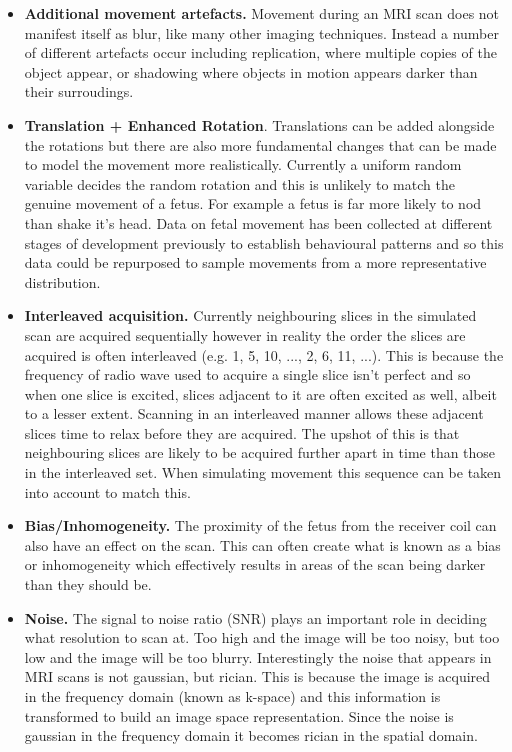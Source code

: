 \begin{itemize}
  \item \textbf{Additional movement artefacts.} Movement during an MRI scan does not manifest itself as blur, like many other imaging techniques. Instead a number of different artefacts occur including replication, where multiple copies of the object appear, or shadowing where objects in motion appears darker than their surroudings.

  \item \textbf{Translation + Enhanced Rotation}. Translations can be added alongside the rotations but there are also more fundamental changes that can be made to model the movement more realistically. Currently a uniform random variable decides the random rotation and this is unlikely to match the genuine movement of a fetus. For example a fetus is far more likely to nod than shake it's head. Data on fetal movement has been collected at different stages of development previously to establish behavioural patterns\cite{fetalmovement} and so this data could be repurposed to sample movements from a more representative distribution.

  \item \textbf{Interleaved acquisition.} Currently neighbouring slices in the simulated scan are acquired sequentially however in reality the order the slices are acquired is often interleaved (e.g. 1, 5, 10, ..., 2, 6, 11, ...). This is because the frequency of radio wave used to acquire a single slice isn't perfect and so when one slice is excited, slices adjacent to it are often excited as well, albeit to a lesser extent\cite{basicsofmri}. Scanning in an interleaved manner allows these adjacent slices time to relax before they are acquired. The upshot of this is that neighbouring slices are likely to be acquired further apart in time than those in the interleaved set. When simulating movement this sequence can be taken into account to match this.

  \item \textbf{Bias/Inhomogeneity.} The proximity of the fetus from the receiver coil can also have an effect on the scan. This can often create what is known as a bias or inhomogeneity which effectively results in areas of the scan being darker than they should be.

  \item \textbf{Noise.} The signal to noise ratio (SNR) plays an important role in deciding what resolution to scan at. Too high and the image will be too noisy, but too low and the image will be too blurry. Interestingly the noise that appears in MRI scans is not gaussian, but rician. This is because the image is acquired in the frequency domain (known as k-space) and this information is transformed to build an image space representation. Since the noise is gaussian in the frequency domain it becomes rician in the spatial domain.
  

\end{itemize}
